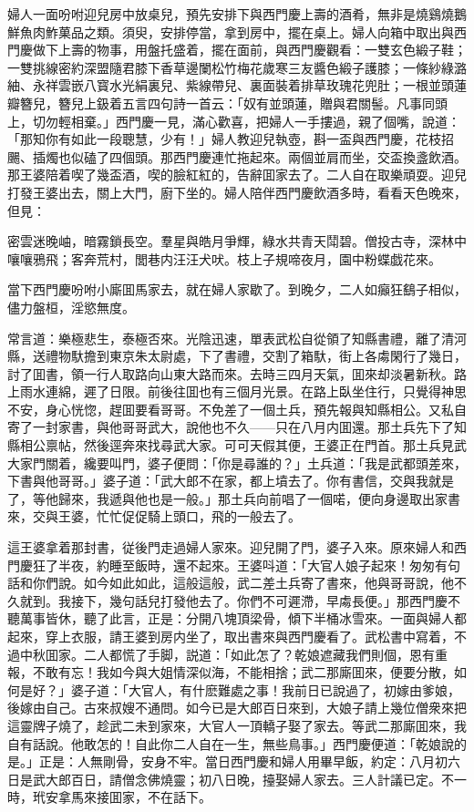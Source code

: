 婦人一面吩咐迎兒房中放桌兒，預先安排下與西門慶上壽的酒肴，無非是燒鷄燒鵝鮮魚肉鮓菓品之類。須臾，安排停當，拿到房中，擺在桌上。婦人向箱中取出與西門慶做下上壽的物事，用盤托盛着，擺在面前，與西門慶觀看：一雙玄色緞子鞋；一雙挑線密約深盟隨君膝下香草邊闌松竹梅花歲寒三友醬色緞子護膝；一條紗綠潞紬、永祥雲嵌八寳水光絹裏兒、紫線帶兒、裏面裝着排草玫瑰花兜肚；一根並頭蓮瓣簪兒，簪兒上鈒着五言四句詩一首云：「奴有並頭蓮，贈與君關髻。凡事同頭上，切勿輕相棄。」西門慶一見，滿心歡喜，把婦人一手摟過，親了個嘴，說道：「那知你有如此一段聰慧，少有！」婦人教迎兒執壺，斟一盃與西門慶，花枝招颺、插燭也似磕了四個頭。那西門慶連忙拖起來。兩個並肩而坐，交盃換盞飲酒。那王婆陪着喫了幾盃酒，喫的臉紅紅的，告辭囬家去了。二人自在取樂頑耍。迎兒打發王婆出去，關上大門，廚下坐的。婦人陪伴西門慶飲酒多時，看看天色晚來，但見：

密雲迷晚岫，暗霧鎖長空。羣星與皓月爭輝，綠水共青天鬦碧。僧投古寺，深林中嚷嚷鴉飛；客奔荒村，閭巷内汪汪犬吠。枝上子規啼夜月，園中粉蝶戯花來。

當下西門慶吩咐小廝囬馬家去，就在婦人家歇了。到晚夕，二人如癲狂鷂子相似，儘力盤桓，淫慾無度。

常言道：樂極悲生，泰極否來。光陰迅速，單表武松自從領了知縣書禮，離了清河縣，送禮物馱擔到東京朱太尉處，下了書禮，交割了箱馱，街上各䖏閑行了幾日，討了囬書，領一行人取路向山東大路而來。去時三四月天氣，囬來却淡暑新秋。路上雨水連綿，遲了日限。前後往囬也有三個月光景。在路上臥坐住行，只覺得神思不安，身心恍惚，趕囬要看哥哥。不免差了一個土兵，預先報與知縣相公。又私自寄了一封家書，與他哥哥武大，說他也不久——只在八月内囬還。那土兵先下了知縣相公禀帖，然後逕奔來找尋武大家。可可天假其便，王婆正在門首。那土兵見武大家門關着，纔要叫門，婆子便問：「你是尋誰的？」土兵道：「我是武都頭差來，下書與他哥哥。」婆子道：「武大郎不在家，都上墳去了。你有書信，交與我就是了，等他歸來，我遞與他也是一般。」那土兵向前唱了一個喏，便向身邊取出家書來，交與王婆，忙忙促促騎上頭口，飛的一般去了。

這王婆拿着那封書，従後門走過婦人家來。迎兒開了門，婆子入來。原來婦人和西門慶狂了半夜，約睡至飯時，還不起來。王婆呌道：「大官人娘子起來！匆匆有句話和你們說。如今如此如此，這般這般，武二差土兵寄了書來，他與哥哥說，他不久就到。我接下，幾句話兒打發他去了。你們不可遲滯，早䖏長便。」那西門慶不聽萬事皆休，聽了此言，正是：分開八塊頂梁骨，傾下半桶冰雪來。一面與婦人都起來，穿上衣服，請王婆到房内坐了，取出書來與西門慶看了。武松書中寫着，不過中秋囬家。二人都慌了手脚，説道：「如此怎了？乾娘遮藏我們則個，恩有重報，不敢有忘！我如今與大姐情深似海，不能相捨；武二那廝囬來，便要分散，如何是好？」婆子道：「大官人，有什麽難處之事！我前日已說過了，初嫁由爹娘，後嫁由自己。古來叔嫂不通問。如今已是大郎百日來到，大娘子請上幾位僧衆來把這靈牌子燒了，趁武二未到家來，大官人一頂轎子娶了家去。等武二那廝囬來，我自有話說。他敢怎的！自此你二人自在一生，無些鳥事。」西門慶便道：「乾娘說的是。」正是：人無剛骨，安身不牢。當日西門慶和婦人用畢早飯，約定：八月初六日是武大郎百日，請僧念佛燒靈；初八日晚，擡娶婦人家去。三人計議已定。不一時，玳安拿馬來接囬家，不在話下。

